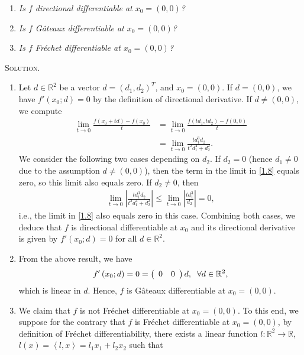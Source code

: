 \documentclass[a4paper]{article}
\numberwithin{equation}{section}
\begin{document}
\begin{enumerate}
\item \textit{Is $f$ directional differentiable at $x_0=\left(0,0\right)$?}
\item \textit{Is $f$ G\^{a}teaux differentiable at $x_0=\left(0,0\right)$?}
\item \textit{Is $f$ Fr\'{e}chet differentiable at $x_0=\left(0,0\right)$?}
\end{enumerate}
\textsc{Solution.} 
\begin{enumerate}
\item Let $d\in \mathbb{R}^2$ be a vector $d=\left(d_1,d_2\right)^T$, and $x_0=\left(0,0\right)$. If $d=\left(0,0\right)$, we have $f'\left(x_0;d\right) =0$ by the definition of directional derivative. If $d\ne \left(0,0\right)$, we compute
\begin{align}
\mathop {\lim }\limits_{t \to 0} \frac{{f\left( {{x_0} + td} \right) - f\left( {{x_0}} \right)}}{t} &= \mathop {\lim }\limits_{t \to 0} \frac{{f\left( {t{d_1},t{d_2}} \right) - f\left( {0,0} \right)}}{t}\\
 &= \mathop {\lim }\limits_{t \to 0} \frac{{td_1^3{d_2}}}{{{t^2}d_1^4 + d_2^2}}. \label{1.8}
\end{align}
We consider the following two cases depending on $d_2$. If $d_2=0$ (hence $d_1\ne 0$ due to the assumption $d\ne \left(0,0\right)$), then the term in the limit in \eqref{1.8} equals zero, so this limit also equals zero. If $d_2 \ne 0$, then
\begin{align}
\mathop {\lim }\limits_{t \to 0} \left| {\frac{{td_1^3{d_2}}}{{{t^2}d_1^4 + d_2^2}}} \right| \le \mathop {\lim }\limits_{t \to 0} \left| {\frac{{td_1^3}}{{{d_2}}}} \right| = 0,
\end{align}
i.e., the limit in \eqref{1.8} also equals zero in this case. Combining both cases, we deduce that $f$ is directional differentiable at $x_0$ and its directional derivative is given by $f'\left(x_0;d\right) =0$ for all $d\in \mathbb{R}^2$.
\item From the above result, we have
\begin{align}
f'\left( {{x_0};d} \right) = 0 = \left( {\begin{array}{*{20}{c}}
0&0
\end{array}} \right)d,\hspace{0.2cm}\forall d \in {\mathbb{R}^2},
\end{align}
which is linear in $d$. Hence, $f$ is G\^{a}teaux differentiable at $x_0=\left(0,0\right)$.
\item We claim that $f$ is not Fr\'{e}chet differentiable at $x_0=\left(0,0\right)$. To this end, we suppose for the contrary that $f$ is Fr\'{e}chet differentiable at $x_0=\left(0,0\right)$, by definition of Fr\'{e}chet differentiability, there exists a linear function $l:\mathbb{R}^2\to \mathbb{R}$, $l\left( x \right) = \left\langle {l,x} \right\rangle  = {l_1}{x_1} + {l_2}{x_2}$ such that

\end{enumerate}
\end{document}
